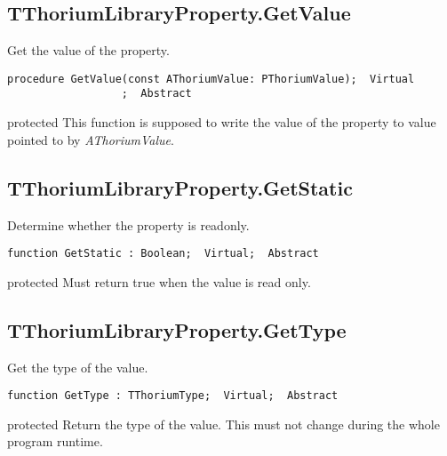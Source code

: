 \subsection{TThoriumLibraryProperty.GetValue}
\label{thoriumcorepkg:thorium:tthoriumlibraryproperty:getvalue}
\begin{FPCList}
\Synopsis
Get the value of the property.\Declaration 

\begin{verbatim}
procedure GetValue(const AThoriumValue: PThoriumValue);  Virtual
                  ;  Abstract
\end{verbatim}
\Visibility
protected
\Description
This function is supposed to write the value of the property to value pointed to by \textit{AThoriumValue}.\end{FPCList}
\subsection{TThoriumLibraryProperty.GetStatic}
\label{thoriumcorepkg:thorium:tthoriumlibraryproperty:getstatic}
\begin{FPCList}
\Synopsis
Determine whether the property is readonly.\Declaration 

\begin{verbatim}
function GetStatic : Boolean;  Virtual;  Abstract
\end{verbatim}
\Visibility
protected
\Description
Must return true when the value is read only.\end{FPCList}
\subsection{TThoriumLibraryProperty.GetType}
\label{thoriumcorepkg:thorium:tthoriumlibraryproperty:gettype}
\begin{FPCList}
\Synopsis
Get the type of the value.\Declaration 

\begin{verbatim}
function GetType : TThoriumType;  Virtual;  Abstract
\end{verbatim}
\Visibility
protected
\Description
Return the type of the value. This must not change during the whole program runtime.\end{FPCList}
